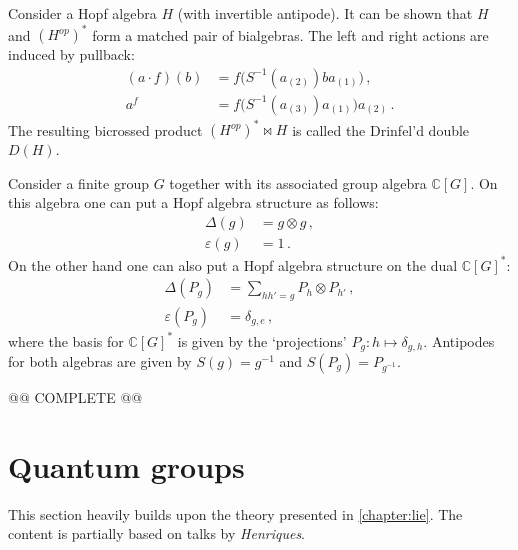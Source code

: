     \begin{construct}
        Consider a Hopf algebra $H$ (with invertible antipode). It can be shown that $H$ and $(H^{op})^*$ form a matched pair of bialgebras. The left and right actions are induced by pullback:
        \begin{align}
            (a\cdot f)(b) &= f\bigl(S^{-1}(a_{(2)})ba_{(1)}\bigr)\,,\\
            a^f &= f\bigl(S^{-1}(a_{(3)})a_{(1)}\bigr)a_{(2)}\,.
        \end{align}
        The resulting bicrossed product $(H^{op})^*\bowtie H$ is called the Drinfel'd double $D(H)$.
    \end{construct}
    \begin{example}
        Consider a finite group $G$ together with its associated group algebra $\mathbb{C}[G]$. On this algebra one can put a Hopf algebra structure as follows:
        \begin{align}
            \Delta(g) &= g\otimes g\,,\\
            \varepsilon(g) &= 1\,.
        \end{align}
        On the other hand one can also put a Hopf algebra structure on the dual $\mathbb{C}[G]^*$:
        \begin{align}
            \Delta(P_g) &= \sum_{hh'=g}P_h\otimes P_{h'}\,,\\
            \varepsilon(P_g) &= \delta_{g,e}\,,
        \end{align}
        where the basis for $\mathbb{C}[G]^*$ is given by the `projections' $P_g:h\mapsto\delta_{g,h}$. Antipodes for both algebras are given by $S(g)=g^{-1}$ and $S(P_g)=P_{g^{-1}}$.

        @@ COMPLETE @@
    \end{example}

\section{Quantum groups}

    This section heavily builds upon the theory presented in \cref{chapter:lie}. The content is partially based on talks by \textit{Henriques}.

